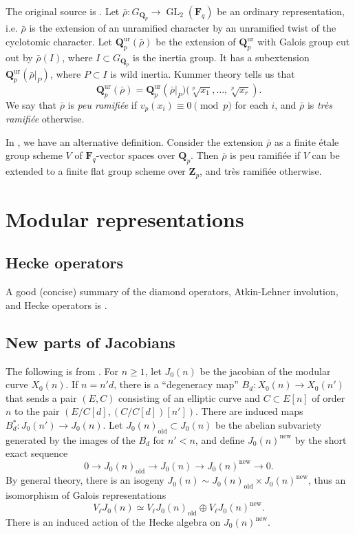\documentclass{amsart}
\DeclareMathOperator{\GL}{GL}
\newcommand{\dF}{\mathbf{F}}
\newcommand{\dQ}{\mathbf{Q}}
\newcommand{\dZ}{\mathbf{Z}}
\begin{document}
The original source is \cite[2.4.6]{serre-1987}. 
Let $\bar\rho:G_{\dQ_p}\to \GL_2(\dF_q)$ be 
an ordinary representation, i.e. $\bar\rho$ is the extension of an unramified 
character by an unramified twist of the cyclotomic character. Let 
$\dQ_p^\mathrm{ur}(\bar\rho)$ be the extension of $\dQ_p^\mathrm{ur}$ with 
Galois group cut out by $\bar\rho(I)$, where $I\subset G_{\dQ_p}$ is the 
inertia group. It has a subextension $\dQ_p^\mathrm{ur}(\bar\rho|_P)$, where 
$P\subset I$ is wild inertia. Kummer theory tells us that 
\[
  \dQ_p^\mathrm{ur}(\bar\rho) = \dQ_p^\mathrm{ur}\left(\bar\rho|_P)(\sqrt[p]{x_1},\dots,\sqrt[p]{x_r}\right).
\]
We say that $\bar\rho$ is \emph{peu ramifi\'ee} if $v_p(x_i)\equiv 0\pmod p$ 
for each $i$, and $\bar\rho$ is \emph{tr\`es ramifi\'ee} otherwise. 

In \cite[8.2]{edixhoven-1992}, we have an alternative definition. Consider the 
extension $\bar\rho$ as a finite \'etale group scheme $V$ of $\dF_q$-vector 
spaces over $\dQ_p$. Then $\bar\rho$ is peu ramifi\'ee if $V$ can be extended 
to a finite flat group scheme over $\dZ_p$, and tr\`es ramifi\'ee otherwise. 





\section{Modular representations}


\subsection{Hecke operators}

A good (concise) summary of the diamond operators, Atkin-Lehner involution, and 
Hecke operators is \cite[ch.2 \S 5]{mw84}. 


\subsection{New parts of Jacobians}

The following is from \cite[\S 2]{mazur-1978}. 
For $n\geqslant 1$, let $J_0(n)$ be the jacobian of the modular curve $X_0(n)$. 
If $n=n' d$, there is a ``degeneracy map'' $B_d:X_0(n)\to X_0(n')$ that sends a 
pair $(E,C)$ consisting of an elliptic curve and $C\subset E[n]$ of order $n$ 
to the pair $(E/C[d],(C/C[d])[n'])$. There are induced maps 
$B_d^\ast:J_0(n')\to J_0(n)$. Let $J_0(n)_\mathrm{old}\subset J_0(n)$ be the 
abelian subvariety generated by the images of the $B_d$ for $n'<n$, and define 
$J_0(n)^\mathrm{new}$ by the short exact sequence 
\[
  0 \to J_0(n)_\mathrm{old} \to J_0(n) \to J_0(n)^\mathrm{new} \to 0 .
\]
By general theory, there is an isogeny 
$J_0(n)\sim J_0(n)_\mathrm{old}\times J_0(n)^\mathrm{new}$, thus an isomorphism 
of Galois representations 
\[
  V_\ell J_0(n) \simeq V_\ell J_0(n)_\mathrm{old}\oplus V_\ell J_0(n)^\mathrm{new} .
\]
There is an induced action of the Hecke algebra on $J_0(n)^\mathrm{new}$. 
\end{document}
